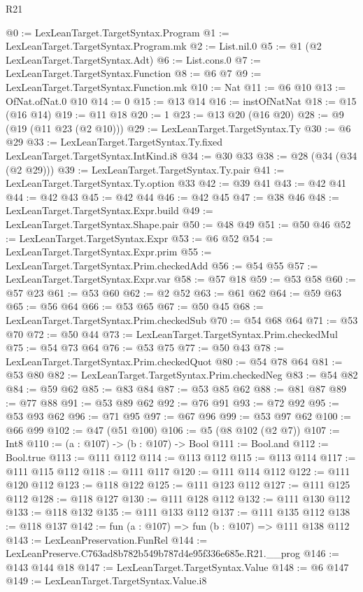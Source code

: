 \begin{lexlean}{R21}
\begin{coremodule}
@0 := LexLeanTarget.TargetSyntax.Program
@1 := LexLeanTarget.TargetSyntax.Program.mk
@2 := List.nil.{0}
@5 := @1 (@2 LexLeanTarget.TargetSyntax.Adt)
@6 := List.cons.{0}
@7 := LexLeanTarget.TargetSyntax.Function
@8 := @6 @7
@9 := LexLeanTarget.TargetSyntax.Function.mk
@10 := Nat
@11 := @6 @10
@13 := OfNat.ofNat.{0} @10
@14 := 0
@15 := @13 @14
@16 := instOfNatNat
@18 := @15 (@16 @14)
@19 := @11 @18
@20 := 1
@23 := @13 @20 (@16 @20)
@28 := @9 (@19 (@11 @23 (@2 @10)))
@29 := LexLeanTarget.TargetSyntax.Ty
@30 := @6 @29
@33 := LexLeanTarget.TargetSyntax.Ty.fixed LexLeanTarget.TargetSyntax.IntKind.i8
@34 := @30 @33
@38 := @28 (@34 (@34 (@2 @29)))
@39 := LexLeanTarget.TargetSyntax.Ty.pair
@41 := LexLeanTarget.TargetSyntax.Ty.option @33
@42 := @39 @41
@43 := @42 @41
@44 := @42 @43
@45 := @42 @44
@46 := @42 @45
@47 := @38 @46
@48 := LexLeanTarget.TargetSyntax.Expr.build
@49 := LexLeanTarget.TargetSyntax.Shape.pair
@50 := @48 @49
@51 := @50 @46
@52 := LexLeanTarget.TargetSyntax.Expr
@53 := @6 @52
@54 := LexLeanTarget.TargetSyntax.Expr.prim
@55 := LexLeanTarget.TargetSyntax.Prim.checkedAdd
@56 := @54 @55
@57 := LexLeanTarget.TargetSyntax.Expr.var
@58 := @57 @18
@59 := @53 @58
@60 := @57 @23
@61 := @53 @60
@62 := @2 @52
@63 := @61 @62
@64 := @59 @63
@65 := @56 @64
@66 := @53 @65
@67 := @50 @45
@68 := LexLeanTarget.TargetSyntax.Prim.checkedSub
@70 := @54 @68 @64
@71 := @53 @70
@72 := @50 @44
@73 := LexLeanTarget.TargetSyntax.Prim.checkedMul
@75 := @54 @73 @64
@76 := @53 @75
@77 := @50 @43
@78 := LexLeanTarget.TargetSyntax.Prim.checkedQuot
@80 := @54 @78 @64
@81 := @53 @80
@82 := LexLeanTarget.TargetSyntax.Prim.checkedNeg
@83 := @54 @82
@84 := @59 @62
@85 := @83 @84
@87 := @53 @85 @62
@88 := @81 @87
@89 := @77 @88
@91 := @53 @89 @62
@92 := @76 @91
@93 := @72 @92
@95 := @53 @93 @62
@96 := @71 @95
@97 := @67 @96
@99 := @53 @97 @62
@100 := @66 @99
@102 := @47 (@51 @100)
@106 := @5 (@8 @102 (@2 @7))
@107 := Int8
@110 := (a : @107) -> (b : @107) -> Bool
@111 := Bool.and
@112 := Bool.true
@113 := @111 @112
@114 := @113 @112
@115 := @113 @114
@117 := @111 @115 @112
@118 := @111 @117
@120 := @111 @114 @112
@122 := @111 @120 @112
@123 := @118 @122
@125 := @111 @123 @112
@127 := @111 @125 @112
@128 := @118 @127
@130 := @111 @128 @112
@132 := @111 @130 @112
@133 := @118 @132
@135 := @111 @133 @112
@137 := @111 @135 @112
@138 := @118 @137
@142 := fun (a : @107) => fun (b : @107) => @111 @138 @112
@143 := LexLeanPreservation.FunRel
@144 := LexLeanPreserve.C763ad8b782b549b787d4e95f336e685e.R21.__prog
@146 := @143 @144 @18
@147 := LexLeanTarget.TargetSyntax.Value
@148 := @6 @147
@149 := LexLeanTarget.TargetSyntax.Value.i8

\end{coremodule}
\end{lexlean}
